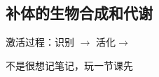 \subsection{补体的生物合成和代谢}%
\label{sub:补体的生物合成和代谢}
\begin{notation}
    激活过程：识别 $\to $ 活化$\to $
\end{notation}
不是很想记笔记，玩一节课先
